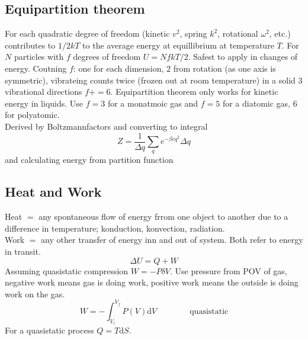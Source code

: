 \documentclass[a4paper, norsk, 8pt]{article}
\begin{document}
\begin{multicols*}{3}
\subsection*{\footnotesize  Equipartition theorem}
For each quadratic degree of freedom (kinetic $v^2$, spring $k^2$, rotational $\omega^2$, etc.) contributes to $1/2kT$ to the average energy at equillibrium at temperature $T$. For $N$ particles with $f$ degrees of freedom $U = NfkT/2$. Safest to apply in changes of energy. Coutning $f$: one for each dimension, $2$ from rotation (as one axis is symmetric), vibrateing counts twice (frozen out at room temperature) in a solid $3$ vibrational directions $f+=6$. Equipartition theorem only works for kinetic energy in liquids. Use $f=3$ for a monatmoic gas and $f=5$ for a diatomic gas, $6$ for polyatomic.\\
Derived by Boltzmannfactors and converting to integral
\begin{equation*}
    Z = \frac{1}{\Delta q}\sum_q e^{-\beta c q^2}\Delta q
\end{equation*}
and calculating energy from partition function
\subsection*{\footnotesize  Heat and Work}
Heat $=$ any spontaneous flow of energy frrom one object to another due to a difference in temperature; konduction, konvection, radiation.\\
Work $=$ any other transfer of energy inn and out of system. Both refer to energy in transit.
\begin{equation*}
  \Delta U = Q + W
\end{equation*}
Assuming quasistatic compression $W = -P\delta V$. Use pressure from POV of gas, negative work means gas is doing work, positive work means the outside is doing work on the gas.
\begin{equation*}
  W = -\int_{V_i}^{V_f}P(V) \mbox{d} V \qquad \qquad \text{quasistatic}
\end{equation*}
For a quasistatic process $Q = T\mbox{d}S$.


\end{multicols*}
\end{document}
